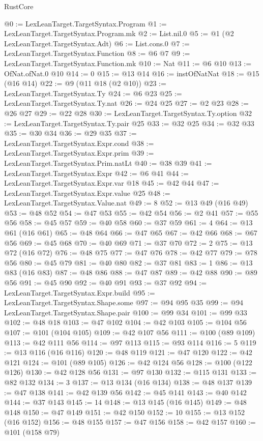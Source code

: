 \begin{lexlean}{RustCore}
\begin{coremodule}
@0 := LexLeanTarget.TargetSyntax.Program
@1 := LexLeanTarget.TargetSyntax.Program.mk
@2 := List.nil.{0}
@5 := @1 (@2 LexLeanTarget.TargetSyntax.Adt)
@6 := List.cons.{0}
@7 := LexLeanTarget.TargetSyntax.Function
@8 := @6 @7
@9 := LexLeanTarget.TargetSyntax.Function.mk
@10 := Nat
@11 := @6 @10
@13 := OfNat.ofNat.{0} @10
@14 := 0
@15 := @13 @14
@16 := instOfNatNat
@18 := @15 (@16 @14)
@22 := @9 (@11 @18 (@2 @10))
@23 := LexLeanTarget.TargetSyntax.Ty
@24 := @6 @23
@25 := LexLeanTarget.TargetSyntax.Ty.nat
@26 := @24 @25
@27 := @2 @23
@28 := @26 @27
@29 := @22 @28
@30 := LexLeanTarget.TargetSyntax.Ty.option
@32 := LexLeanTarget.TargetSyntax.Ty.pair @25
@33 := @32 @25
@34 := @32 @33
@35 := @30 @34
@36 := @29 @35
@37 := LexLeanTarget.TargetSyntax.Expr.cond
@38 := LexLeanTarget.TargetSyntax.Expr.prim
@39 := LexLeanTarget.TargetSyntax.Prim.natLt
@40 := @38 @39
@41 := LexLeanTarget.TargetSyntax.Expr
@42 := @6 @41
@44 := LexLeanTarget.TargetSyntax.Expr.var @18
@45 := @42 @44
@47 := LexLeanTarget.TargetSyntax.Expr.value @25
@48 := LexLeanTarget.TargetSyntax.Value.nat
@49 := 8
@52 := @13 @49 (@16 @49)
@53 := @48 @52
@54 := @47 @53
@55 := @42 @54
@56 := @2 @41
@57 := @55 @56
@58 := @45 @57
@59 := @40 @58
@60 := @37 @59
@61 := 4
@64 := @13 @61 (@16 @61)
@65 := @48 @64
@66 := @47 @65
@67 := @42 @66
@68 := @67 @56
@69 := @45 @68
@70 := @40 @69
@71 := @37 @70
@72 := 2
@75 := @13 @72 (@16 @72)
@76 := @48 @75
@77 := @47 @76
@78 := @42 @77
@79 := @78 @56
@80 := @45 @79
@81 := @40 @80
@82 := @37 @81
@83 := 1
@86 := @13 @83 (@16 @83)
@87 := @48 @86
@88 := @47 @87
@89 := @42 @88
@90 := @89 @56
@91 := @45 @90
@92 := @40 @91
@93 := @37 @92
@94 := LexLeanTarget.TargetSyntax.Expr.build
@95 := LexLeanTarget.TargetSyntax.Shape.some
@97 := @94 @95 @35
@99 := @94 LexLeanTarget.TargetSyntax.Shape.pair
@100 := @99 @34
@101 := @99 @33
@102 := @48 @18
@103 := @47 @102
@104 := @42 @103
@105 := @104 @56
@107 := @101 (@104 @105)
@109 := @42 @107 @56
@111 := @100 (@89 @109)
@113 := @42 @111 @56
@114 := @97 @113
@115 := @93 @114
@116 := 5
@119 := @13 @116 (@16 @116)
@120 := @48 @119
@121 := @47 @120
@122 := @42 @121
@124 := @101 (@89 @105)
@126 := @42 @124 @56
@128 := @100 (@122 @126)
@130 := @42 @128 @56
@131 := @97 @130
@132 := @115 @131
@133 := @82 @132
@134 := 3
@137 := @13 @134 (@16 @134)
@138 := @48 @137
@139 := @47 @138
@141 := @42 @139 @56
@142 := @45 @141
@143 := @40 @142
@144 := @37 @143
@145 := 14
@148 := @13 @145 (@16 @145)
@149 := @48 @148
@150 := @47 @149
@151 := @42 @150
@152 := 10
@155 := @13 @152 (@16 @152)
@156 := @48 @155
@157 := @47 @156
@158 := @42 @157
@160 := @101 (@158 @79)

\end{coremodule}
\end{lexlean}

